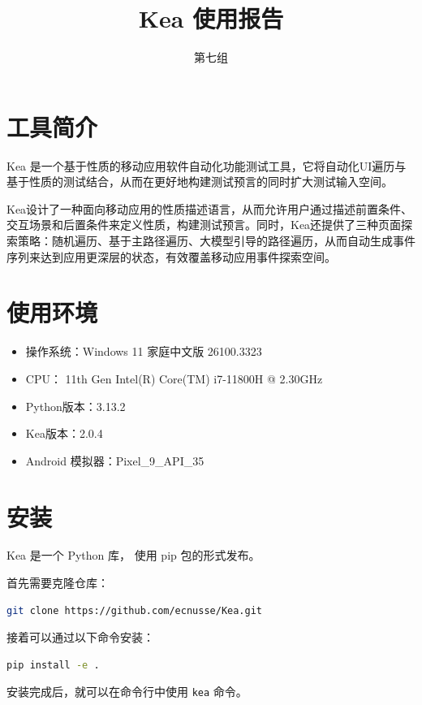 \documentclass{article}
\title{\heiti\textbf{Kea 使用报告}}
\author{第七组}
\date{}
\begin{document}
\maketitle

\section{工具简介}

Kea 是一个基于性质的移动应用软件自动化功能测试工具，它将自动化UI遍历与基于性质的测试结合，从而在更好地构建测试预言的同时扩大测试输入空间。

Kea设计了一种面向移动应用的性质描述语言，从而允许用户通过描述前置条件、交互场景和后置条件来定义性质，构建测试预言。同时，Kea还提供了三种页面探索策略：随机遍历、基于主路径遍历、大模型引导的路径遍历，从而自动生成事件序列来达到应用更深层的状态，有效覆盖移动应用事件探索空间。

\section{使用环境}

\begin{itemize}[noitemsep]
    \item 操作系统：Windows 11 家庭中文版 26100.3323
    \item CPU： 11th Gen Intel(R) Core(TM) i7-11800H @ 2.30GHz
    \item Python版本：3.13.2
    \item Kea版本：2.0.4
    \item Android 模拟器：Pixel\_9\_API\_35
\end{itemize}

\section{安装}

Kea 是一个 Python 库，
使用 pip 包的形式发布。

首先需要克隆仓库：

\begin{lstlisting}[language=bash]
    git clone https://github.com/ecnusse/Kea.git
\end{lstlisting}

接着可以通过以下命令安装：

\begin{lstlisting}[language=bash]
    pip install -e .
\end{lstlisting}

安装完成后，就可以在命令行中使用 \texttt{kea} 命令。
\end{document}
